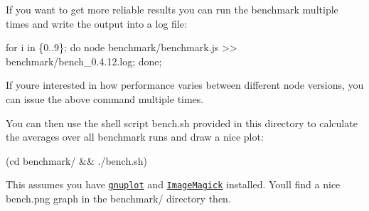If you want to get more reliable results you can run the benchmark multiple times and write the output into a log file\+:


\begin{DoxyCode}
for i in \{0..9\}; do node benchmark/benchmark.js >> benchmark/bench\_0.4.12.log; done;
\end{DoxyCode}


If you\textquotesingle{}re interested in how performance varies between different node versions, you can issue the above command multiple times.

You can then use the shell script {\ttfamily bench.\+sh} provided in this directory to calculate the averages over all benchmark runs and draw a nice plot\+:


\begin{DoxyCode}
(cd benchmark/ && ./bench.sh)
\end{DoxyCode}


This assumes you have \href{http://www.gnuplot.info/}{\tt gnuplot} and \href{http://www.imagemagick.org/}{\tt Image\+Magick} installed. You\textquotesingle{}ll find a nice {\ttfamily bench.\+png} graph in the {\ttfamily benchmark/} directory then. 